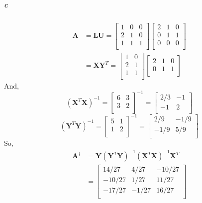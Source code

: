 \documentclass[22pt]{article}
\begin{document}
		\subparagraph{c}
		\begin{align}
			\mathbf{A}& = \mathbf{LU} = \left[ \begin{array}{ccc} 1&0&0\\2&1&0\\1&1&1\\ \end{array}\right] \left[ \begin{array}{ccc} 2&1&0\\0&1&1\\0&0&0\\\end{array}\right]\\
			& = \mathbf{XY}^T =  \left[ \begin{array}{cc} 1&0\\2&1\\1&1\\ \end{array}\right]\left[ \begin{array}{ccc} 2&1&0\\0&1&1\\\end{array}\right]
		\end{align}
		And,
		\begin{equation}
			(\mathbf{X}^T\mathbf{X})^{-1} = \left[ \begin{array}{cc}6&3\\3&2\\ \end{array}\right]^{-1} =  \left[ \begin{array}{ccc}2/3&-1\\ -1&2\\ \end{array}\right]	
		\end{equation}
		\begin{equation}
			(\mathbf{Y}^T\mathbf{Y})^{-1} = \left[ \begin{array}{cc}5&1\\1&2\\ \end{array}\right]^{-1} =  \left[ \begin{array}{ccc}2/9&-1/9\\ -1/9&5/9\\ \end{array}\right]
		\end{equation}
		So, 
		\begin{align}
			\mathbf{A}^\dagger & = \mathbf{Y}(\mathbf{Y}^T\mathbf{Y})^{-1}(\mathbf{X}^T\mathbf{X})^{-1}\mathbf{X}^T\\
			& = \left[ \begin{array}{ccc} 14/27& 4/27&-10/27\\ -10/27&1/27&11/27\\-17/27  &-1/27 &16/27\\     \end{array}\right]
		\end{align}
\end{document}
